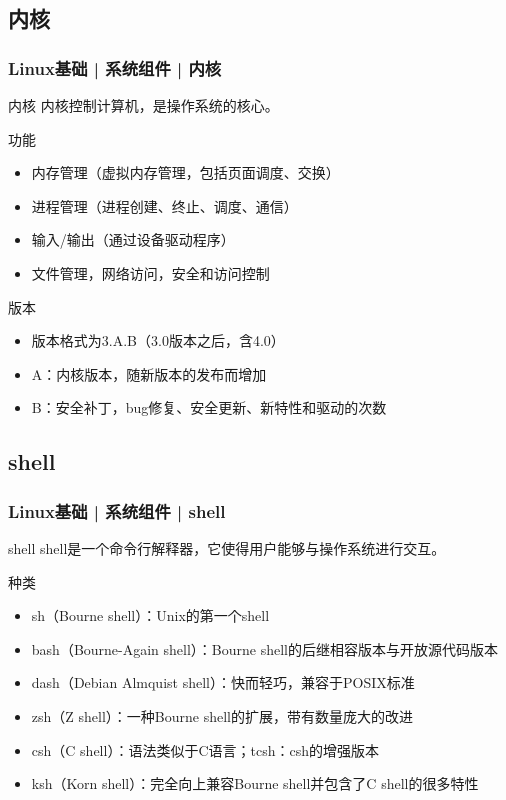 \subsection{内核}
\begin{frame}
  \frametitle{Linux基础 | 系统组件 | 内核}
  \begin{block}{内核}
    内核控制计算机，是操作系统的核心。
  \end{block}
  \pause
  \begin{block}{功能}
  \begin{itemize}
    \item 内存管理（虚拟内存管理，包括页面调度、交换）
    \item 进程管理（进程创建、终止、调度、通信）
    \item 输入/输出（通过设备驱动程序）
    \item 文件管理，网络访问，安全和访问控制
  \end{itemize}
  \end{block}
  \pause
  \begin{block}{版本}
  \begin{itemize}
    \item 版本格式为3.A.B（3.0版本之后，含4.0）
    \item A：内核版本，随新版本的发布而增加
    \item B：安全补丁，bug修复、安全更新、新特性和驱动的次数
  \end{itemize}
  \end{block}
\end{frame}

\subsection{shell}
\begin{frame}
  \frametitle{Linux基础 | 系统组件 | shell}
  \begin{block}{shell}
    shell是一个命令行解释器，它使得用户能够与操作系统进行交互。
  \end{block}
  \pause
  \begin{block}{\alert{种类}}
  \begin{itemize}[<+->]
    \item sh（Bourne shell）：Unix的第一个shell
    \item bash（Bourne-Again shell）：Bourne shell的后继相容版本与开放源代码版本
    \item dash（Debian Almquist shell）：快而轻巧，兼容于POSIX标准
    \item zsh（Z shell）：一种Bourne shell的扩展，带有数量庞大的改进
    \item csh（C shell）：语法类似于C语言；tcsh：csh的增强版本
    \item ksh（Korn shell）：完全向上兼容Bourne shell并包含了C shell的很多特性
  \end{itemize}
  \end{block}
\end{frame}

